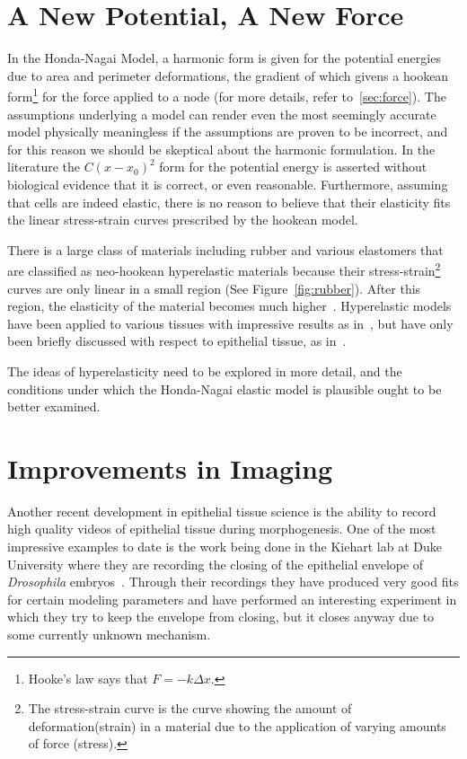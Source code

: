 \section{A New Potential, A New Force}
In the Honda-Nagai Model, a harmonic form is given for the potential energies due to area and perimeter deformations, the gradient of which givens a hookean form\footnote{Hooke's law says that $F=-k\Delta x$.} for the force applied to a node (for more details, refer to~\ref{sec:force}). The assumptions underlying a model can render even the most seemingly accurate model physically meaningless if the assumptions are proven to be incorrect, and for this reason we should be skeptical about the harmonic formulation. In the literature the $C(x-x_0)^2$ form for the potential energy is asserted without biological evidence that it is correct, or even reasonable. Furthermore, assuming that cells are indeed elastic, there is no reason to believe that their elasticity fits the linear stress-strain curves prescribed by the hookean model.

There is a large class of materials including rubber and various elastomers that are classified as neo-hookean hyperelastic materials because their stress-strain\footnote{The stress-strain curve is the curve showing the amount of deformation(strain) in a material due to the application of varying amounts of force (stress).} curves are only linear in a small region (See Figure~\ref{fig:rubber}). After this region, the elasticity of the material becomes much higher~\cite{Rubber, Rubber2}. Hyperelastic models have been applied to various tissues with impressive results as in~\cite{hyperbio, hyperbio2}, but have only been briefly discussed with respect to epithelial tissue, as in~\cite{epihyper, epihyper2}.

The ideas of hyperelasticity need to be explored in more detail, and the conditions under which the Honda-Nagai elastic model is plausible ought to be better examined.

\section{Improvements in Imaging}
Another recent development in epithelial tissue science is the ability to record high quality videos of epithelial tissue during morphogenesis. One of the most impressive examples to date is the work being done in the Kiehart lab at Duke University where they are recording the closing of the epithelial envelope of \emph{Drosophila} embryos~\cite{Sokolow}. Through their recordings they have produced very good fits for certain modeling parameters and have performed an interesting experiment in which they try to keep the envelope from closing, but it closes anyway due to some currently unknown mechanism. 

